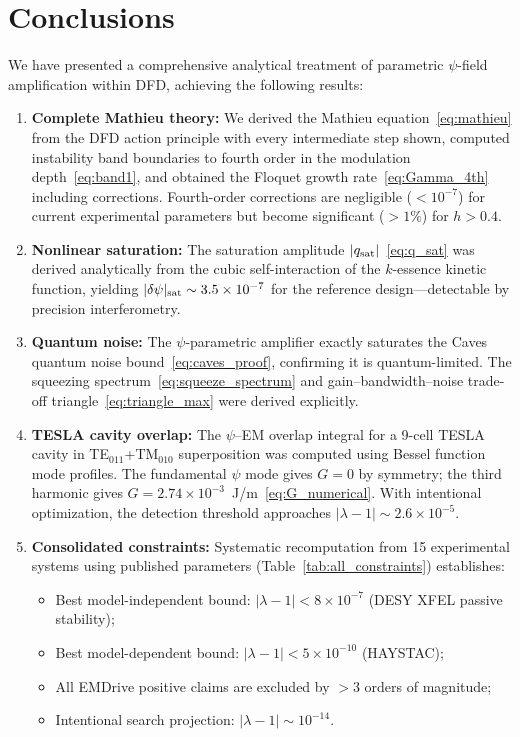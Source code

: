 \documentclass[12pt,aps,prd,twocolumn,superscriptaddress,nofootinbib]{revtex4-2}
\begin{document}
\section{Conclusions}
\label{sec:conclusions}

We have presented a comprehensive analytical treatment of
parametric $\psi$-field amplification within DFD, achieving the
following results:

\begin{enumerate}
\item \textbf{Complete Mathieu theory:} We derived the Mathieu
equation~\eqref{eq:mathieu} from the DFD action principle with
every intermediate step shown, computed instability band boundaries
to fourth order in the modulation depth~\eqref{eq:band1}, and
obtained the Floquet growth rate~\eqref{eq:Gamma_4th} including
corrections.  Fourth-order corrections are negligible ($<10^{-7}$)
for current experimental parameters but become significant ($>1\%$)
for $h > 0.4$.

\item \textbf{Nonlinear saturation:} The saturation amplitude
$|q_{\rm sat}|$~\eqref{eq:q_sat} was derived analytically from
the cubic self-interaction of the $k$-essence kinetic function,
yielding $|\delta\psi|_{\rm sat} \sim 3.5\times10^{-7}$ for the
reference design---detectable by precision interferometry.

\item \textbf{Quantum noise:} The $\psi$-parametric amplifier
exactly saturates the Caves quantum noise
bound~\eqref{eq:caves_proof}, confirming it is quantum-limited.
The squeezing spectrum~\eqref{eq:squeeze_spectrum} and
gain--bandwidth--noise trade-off triangle~\eqref{eq:triangle_max}
were derived explicitly.

\item \textbf{TESLA cavity overlap:} The $\psi$--EM overlap integral
for a 9-cell TESLA cavity in TE$_{011}$+TM$_{010}$ superposition
was computed using Bessel function mode profiles.  The fundamental
$\psi$ mode gives $G = 0$ by symmetry; the third harmonic gives
$G = 2.74\times10^{-3}$~J/m~\eqref{eq:G_numerical}.  With intentional
optimization, the detection threshold approaches $|\lambda-1| \sim
2.6\times10^{-5}$.

\item \textbf{Consolidated constraints:} Systematic recomputation
from 15 experimental systems using published parameters
(Table~\ref{tab:all_constraints}) establishes:
\begin{itemize}[noitemsep]
\item Best model-independent bound: $|\lambda-1| < 8\times10^{-7}$
(DESY XFEL passive stability);
\item Best model-dependent bound: $|\lambda-1| < 5\times10^{-10}$
(HAYSTAC);
\item All EMDrive positive claims are excluded by $>3$ orders
of magnitude;
\item Intentional search projection: $|\lambda-1| \sim 10^{-14}$.
\end{itemize}
\end{enumerate}
\end{document}
